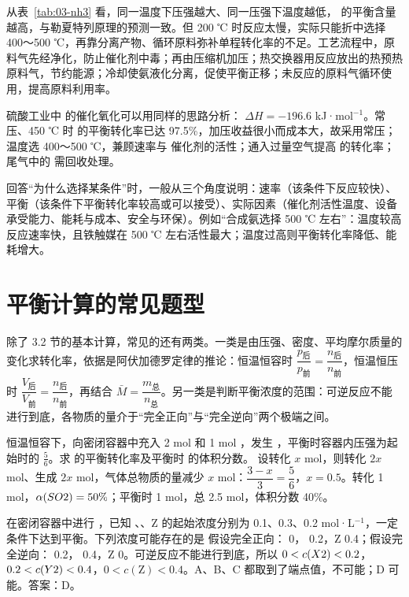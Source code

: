 从表~\ref{tab:03-nh3} 看，同一温度下压强越大、同一压强下温度越低， 的平衡含量越高，与勒夏特列原理的预测一致。但 200 ℃ 时反应太慢，实际只能折中选择 400～500 ℃，再靠分离产物、循环原料弥补单程转化率的不足。工艺流程中，原料气先经净化，防止催化剂中毒；再由压缩机加压；热交换器用反应放出的热预热原料气，节约能源；冷却使氨液化分离，促使平衡正移；未反应的原料气循环使用，提高原料利用率。

硫酸工业中  的催化氧化可以用同样的思路分析： $\Delta H=-196.6$ kJ·mol$^{-1}$。常压、450 ℃ 时  的平衡转化率已达 97.5\%，加压收益很小而成本大，故采用常压；温度选 400～500 ℃，兼顾速率与  催化剂的活性；通入过量空气提高  的转化率；尾气中的  需回收处理。

回答“为什么选择某条件”时，一般从三个角度说明：速率（该条件下反应较快）、平衡（该条件下平衡转化率较高或可以接受）、实际因素（催化剂活性温度、设备承受能力、能耗与成本、安全与环保）。例如“合成氨选择 500 ℃ 左右”：温度较高反应速率快，且铁触媒在 500 ℃ 左右活性最大；温度过高则平衡转化率降低、能耗增大。

\section{平衡计算的常见题型}

除了 3.2 节的基本计算，常见的还有两类。一类是由压强、密度、平均摩尔质量的变化求转化率，依据是阿伏加德罗定律的推论：恒温恒容时 $\dfrac{p_\text{后}}{p_\text{前}}=\dfrac{n_\text{后}}{n_\text{前}}$，恒温恒压时 $\dfrac{V_\text{后}}{V_\text{前}}=\dfrac{n_\text{后}}{n_\text{前}}$，再结合 $\bar M=\dfrac{m_\text{总}}{n_\text{总}}$。另一类是判断平衡浓度的范围：可逆反应不能进行到底，各物质的量介于“完全正向”与“完全逆向”两个极端之间。

\begin{liti}[由压强变化求转化率]
恒温恒容下，向密闭容器中充入 2 mol  和 1 mol ，发生 ，平衡时容器内压强为起始时的 $\frac56$。求  的平衡转化率及平衡时  的体积分数。
\tcblower
\jie 设转化  $x$ mol，则转化  $2x$ mol、生成  $2x$ mol，气体总物质的量减少 $x$ mol：$\dfrac{3-x}{3}=\dfrac56$，$x=0.5$。转化  1 mol，$\alpha(SO2)=50\%$；平衡时  1 mol，总 2.5 mol，体积分数 40\%。
\end{liti}

\begin{liti}[极值法判断范围]
在密闭容器中进行 ，已知 、、Z 的起始浓度分别为 0.1、0.3、0.2 mol·L$^{-1}$，一定条件下达到平衡。下列浓度可能存在的是
\tcblower
\jie 假设完全正向： 0， 0.2，Z 0.4；假设完全逆向： 0.2， 0.4，Z 0。可逆反应不能进行到底，所以 $0<c(X2)<0.2$，$0.2<c(Y2)<0.4$，$0<c(\mathrm{Z})<0.4$。A、B、C 都取到了端点值，不可能；D 可能。答案：D。
\end{liti}

